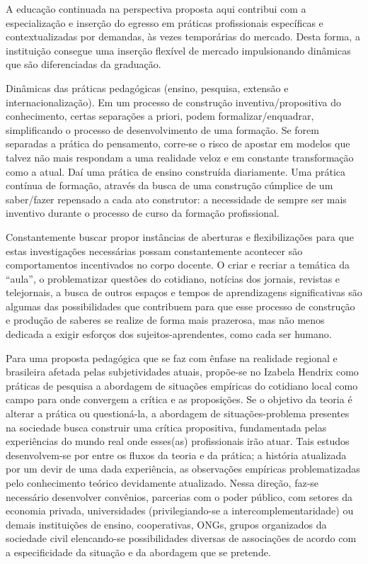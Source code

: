 \documentclass[a4paper, 12pt, openright, oneside, german, french, english, brazil]{abntex2}
\begin{document}
A educação continuada na perspectiva proposta aqui contribui com a especialização e inserção do egresso em práticas profissionais específicas e contextualizadas por demandas, às vezes temporárias do mercado. Desta forma, a instituição consegue uma inserção flexível de mercado impulsionando dinâmicas que são diferenciadas da graduação.

Dinâmicas das práticas pedagógicas (ensino, pesquisa, extensão e internacionalização). Em um processo de construção inventiva/propositiva do conhecimento, certas separações a priori, podem formalizar/enquadrar, simplificando o processo de desenvolvimento de uma formação. Se forem separadas a prática do pensamento, corre-se o risco de apostar em modelos que talvez não mais respondam a uma realidade veloz e em constante transformação como a atual. Daí uma prática de ensino construída diariamente. Uma prática contínua de formação, através da busca de uma construção cúmplice de um saber/fazer repensado a cada ato construtor: a necessidade de sempre ser mais inventivo durante o processo de curso da formação profissional.

Constantemente buscar propor instâncias de aberturas e flexibilizações para que estas investigações necessárias possam constantemente acontecer são comportamentos incentivados no corpo docente. O criar e recriar a temática da “aula”, o problematizar questões do cotidiano, notícias dos jornais, revistas e telejornais, a busca de outros espaços e tempos de aprendizagens significativas são algumas das possibilidades que contribuem para que esse processo de construção e produção de saberes se realize de forma mais prazerosa, mas não menos dedicada a exigir esforços dos sujeitos-aprendentes, como cada ser humano.

Para uma proposta pedagógica que se faz com ênfase na realidade regional e brasileira afetada pelas subjetividades atuais, propõe-se no Izabela Hendrix como práticas de pesquisa a abordagem de situações empíricas do cotidiano local como campo para onde convergem a crítica e as proposições. Se o objetivo da teoria é alterar a prática ou questioná-la, a abordagem de situações-problema presentes na sociedade busca construir uma crítica propositiva, fundamentada pelas experiências do mundo real onde esses(as) profissionais irão atuar. Tais estudos desenvolvem-se por entre os fluxos da teoria e da prática; a história atualizada por um devir de uma dada experiência, as observações empíricas problematizadas pelo conhecimento teórico devidamente atualizado. Nessa direção, faz-se necessário desenvolver convênios, parcerias com o poder público, com setores da economia privada, universidades (privilegiando-se a intercomplementaridade) ou demais instituições de ensino, cooperativas, ONGs, grupos organizados da sociedade civil elencando-se possibilidades diversas de associações de acordo com a especificidade da situação e da abordagem que se pretende.
\end{document}
